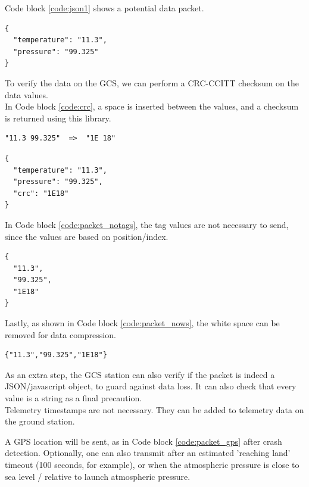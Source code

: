 \documentclass[10pt, a4paper]{article}
\begin{document}
Code block \ref{code:json1} shows a potential data packet.

\begin{lstlisting}
{
  "temperature": "11.3",
  "pressure": "99.325"
}
\end{lstlisting}

To verify the data on the GCS, we can perform a CRC-CCITT checksum on the data values\cite{crc-cal}.\\

In Code block \ref{code:crc}, a space is inserted between the values, and a checksum is returned using this library\cite{crc-lib}.

\begin{lstlisting}
"11.3 99.325"  =>  "1E 18"
\end{lstlisting}

\begin{lstlisting}
{
  "temperature": "11.3",
  "pressure": "99.325",
  "crc": "1E18"
}
\end{lstlisting}

In Code block \ref{code:packet_notags}, the tag values are not necessary to send, since the values are based on position/index.


\begin{lstlisting}
{
  "11.3",
  "99.325",
  "1E18"
}
\end{lstlisting}

Lastly, as shown in Code block \ref{code:packet_nows}, the white space can be removed for data compression.

\begin{lstlisting}
{"11.3","99.325","1E18"}
\end{lstlisting}

As an extra step, the GCS station can also verify if the packet is indeed a JSON/javascript object, to guard against data loss. It can also check that every value is a string as a final precaution.\\

Telemetry timestamps are not necessary. They can be added to telemetry data on the ground station.

A GPS location will be sent, as in Code block \ref{code:packet_gps} after crash detection. Optionally, one can also transmit after an estimated 'reaching land' timeout (100 seconds, for example), or when the atmospheric pressure is close to sea level / relative to launch atmospheric pressure.
\end{document}
